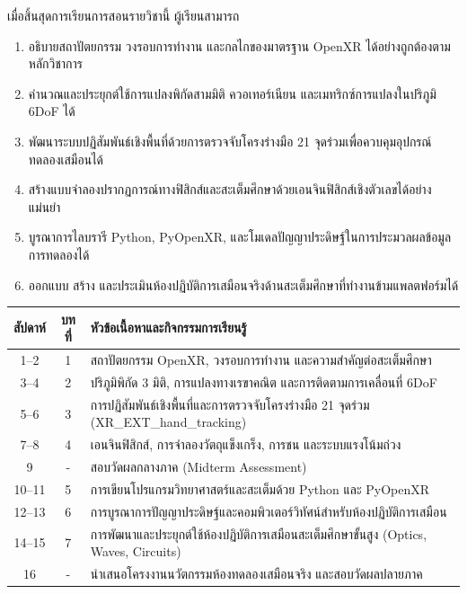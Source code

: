 \begin{tcolorbox}[enhanced, colback=white, colframe=spatialBlue, colbacktitle=spatialBlue,
    coltitle=white, fonttitle=\bfseries\normalsize,
    title={วัตถุประสงค์การเรียนรู้ตามแนวทาง OBE},
    arc=2mm, boxrule=0.8pt, leftrule=4mm,
    top=8pt, bottom=8pt, left=10pt, right=10pt, before skip=8pt]
เมื่อสิ้นสุดการเรียนการสอนรายวิชานี้ ผู้เรียนสามารถ
\begin{enumerate}
    \item อธิบายสถาปัตยกรรม วงรอบการทำงาน และกลไกของมาตรฐาน OpenXR ได้อย่างถูกต้องตามหลักวิชาการ
    \item คำนวณและประยุกต์ใช้การแปลงพิกัดสามมิติ ควอเทอร์เนียน และเมทริกซ์การแปลงในปริภูมิ 6DoF ได้
    \item พัฒนาระบบปฏิสัมพันธ์เชิงพื้นที่ด้วยการตรวจจับโครงร่างมือ 21 จุดร่วมเพื่อควบคุมอุปกรณ์ทดลองเสมือนได้
    \item สร้างแบบจำลองปรากฏการณ์ทางฟิสิกส์และสะเต็มศึกษาด้วยเอนจินฟิสิกส์เชิงตัวเลขได้อย่างแม่นยำ
    \item บูรณาการไลบรารี Python, PyOpenXR, และโมเดลปัญญาประดิษฐ์ในการประมวลผลข้อมูลการทดลองได้
    \item ออกแบบ สร้าง และประเมินห้องปฏิบัติการเสมือนจริงด้านสะเต็มศึกษาที่ทำงานข้ามแพลตฟอร์มได้
\end{enumerate}
\end{tcolorbox}

\begin{tcolorbox}[enhanced, colback=white, colframe=rbruGold!80!black, colbacktitle=rbruGold!80!black,
    coltitle=white, fonttitle=\bfseries\normalsize,
    title={โครงสร้างแผนการจัดการเรียนรู้รายสัปดาห์ (16 สัปดาห์)},
    arc=2mm, boxrule=0.8pt, leftrule=4mm,
    top=8pt, bottom=8pt, left=10pt, right=10pt, before skip=8pt]
\begin{tabularx}{\textwidth}{ccX}
\toprule
\textbf{สัปดาห์} & \textbf{บทที่} & \textbf{หัวข้อเนื้อหาและกิจกรรมการเรียนรู้} \\
\midrule
1--2 & 1 & สถาปัตยกรรม OpenXR, วงรอบการทำงาน และความสำคัญต่อสะเต็มศึกษา \\
3--4 & 2 & ปริภูมิพิกัด 3 มิติ, การแปลงทางเรขาคณิต และการติดตามการเคลื่อนที่ 6DoF \\
5--6 & 3 & การปฏิสัมพันธ์เชิงพื้นที่และการตรวจจับโครงร่างมือ 21 จุดร่วม (XR\_EXT\_hand\_tracking) \\
7--8 & 4 & เอนจินฟิสิกส์, การจำลองวัตถุแข็งเกร็ง, การชน และระบบแรงโน้มถ่วง \\
9 & - & สอบวัดผลกลางภาค (Midterm Assessment) \\
10--11 & 5 & การเขียนโปรแกรมวิทยาศาสตร์และสะเต็มด้วย Python และ PyOpenXR \\
12--13 & 6 & การบูรณาการปัญญาประดิษฐ์และคอมพิวเตอร์วิทัศน์สำหรับห้องปฏิบัติการเสมือน \\
14--15 & 7 & การพัฒนาและประยุกต์ใช้ห้องปฏิบัติการเสมือนสะเต็มศึกษาขั้นสูง (Optics, Waves, Circuits) \\
16 & - & นำเสนอโครงงานนวัตกรรมห้องทดลองเสมือนจริง และสอบวัดผลปลายภาค \\
\bottomrule
\end{tabularx}
\end{tcolorbox}

